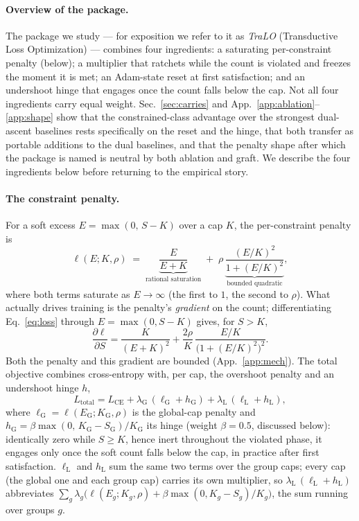 \documentclass[10pt]{article}
\begin{document}
\paragraph{Overview of the package.}
The package we study --- for exposition we refer to it as \emph{TraLO}
(Transductive Loss Optimization) --- combines four ingredients: a saturating
per-constraint penalty (below); a multiplier that ratchets while the count is
violated and freezes the moment it is met; an Adam-state reset at first
satisfaction; and an undershoot hinge that engages once the count falls below
the cap. Not all four ingredients carry equal weight. Sec.~\ref{sec:carries}
and App.~\ref{app:ablation}--\ref{app:shape} show that the constrained-class
advantage over the strongest dual-ascent baselines rests specifically on the
reset and the hinge, that both transfer as portable additions to the dual
baselines, and that the penalty shape after which the package is named is
neutral by both ablation and graft. We describe the four ingredients below
before returning to the empirical story.

\paragraph{The constraint penalty.}
For a soft excess $E = \max(0,\, S - K)$ over a cap $K$, the per-constraint
penalty is
\begin{equation}
\label{eq:loss}
\ell(E;K,\rho)\;=\;\underbrace{\frac{E}{E+K}}_{\text{rational saturation}}
\;+\;\rho\,\underbrace{\frac{(E/K)^2}{1+(E/K)^2}}_{\text{bounded quadratic}} ,
\end{equation}
where both terms saturate as $E\!\to\!\infty$ (the first to $1$, the second
to $\rho$). What actually drives training is the penalty's \emph{gradient}
on the count; differentiating Eq.~\eqref{eq:loss} through $E=\max(0,S-K)$
gives, for $S>K$,
\begin{equation}
\label{eq:grad}
\frac{\partial \ell}{\partial S}
= \frac{K}{(E+K)^2} + \frac{2\rho}{K}\,\frac{E/K}{\bigl(1+(E/K)^2\bigr)^2}.
\end{equation}
Both the penalty and this gradient are bounded (App.~\ref{app:mech}). The
total objective combines cross-entropy with, per cap, the overshoot penalty
and an undershoot hinge $h$,
\begin{equation}
\label{eq:total}
L_{\text{total}} = L_{\text{CE}} + \lambda_{\mathrm{G}}\,(\ell_{\mathrm{G}} + h_{\mathrm{G}}) + \lambda_{\mathrm{L}}\,(\ell_{\mathrm{L}} + h_{\mathrm{L}}) ,
\end{equation}
where $\ell_{\mathrm{G}}=\ell(E_{\mathrm{G}};K_{\mathrm{G}},\rho)$ is the global-cap penalty and
$h_{\mathrm{G}}=\beta\max(0,\,K_{\mathrm{G}}-S_{\mathrm{G}})/K_{\mathrm{G}}$ its hinge (weight $\beta{=}0.5$, discussed below):
identically zero while $S\ge K$, hence inert throughout the violated phase,
it engages only once the soft count falls below the cap, in practice after
first satisfaction. $\ell_{\mathrm{L}}$ and $h_{\mathrm{L}}$ sum the same two terms over the
group caps; every cap (the global one and each group cap) carries its own
multiplier, so $\lambda_{\mathrm{L}}\,(\ell_{\mathrm{L}}+h_{\mathrm{L}})$ abbreviates
$\sum_g \lambda_g\bigl(\ell(E_g;K_g,\rho)+\beta\max(0,K_g-S_g)/K_g\bigr)$, the sum running over groups $g$.
\end{document}
